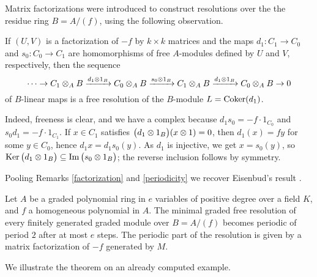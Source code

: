 Matrix factorizations were introduced to construct resolutions over the
the residue ring $B=A/(f)$, using the following observation.

\begin{Remark}
\label{periodicity}
If $(U,V)$ is a factorization of $-f$ by $k\times k$ matrices and the
maps $d_1\colon C_1\to C_0$ and $s_0\colon C_0\to C_1$ are
homomorphisms of free $A$-modules defined by $U$ and $V$, respectively,
then the sequence
\[
\cdots \to
C_1\otimes_AB \xrightarrow{d_1\otimes 1_B}
C_0\otimes_AB \xrightarrow{s_0\otimes 1_B}
C_1\otimes_AB \xrightarrow{d_1\otimes 1_B}
C_0\otimes_AB\to0
\]
of $B$-linear maps is a free resolution of the $B$-module
$L=\operatorname{Coker}(d_1)$.

Indeed, freeness is clear, and we have a complex because $d_1s_0=
-f\cdot 1_{C_0}$ and $s_0d_1=-f\cdot 1_{C_1}$.  If $x\in C_1$ satisfies
$\big(d_1\otimes1_B\big)(x\otimes 1)=0$, then $d_1(x)=fy$ for some $y\in C_0$,
hence $d_1x=d_1s_0(y)$.  As $d_1$ is injective, we get $x=s_0(y)$, so
$\operatorname{Ker}\big(d_1\otimes1_B\big)\subseteq \operatorname{Im}\big(s_0\otimes1_B\big)$; the reverse
inclusion follows by symmetry.
 \end{Remark}

Pooling Remarks \ref{factorization} and \ref{periodicity} we recover
Eisenbud's result \cite[Sect.\ 6]{CI:Ei}.

\begin{theorem}
Let $A$ be a graded polynomial ring in $e$ variables of positive degree
over a field $K$, and $f$ a homogeneous polynomial in $A$.  The minimal
graded free resolution of every finitely generated graded module over
$B=A/(f)$ becomes periodic of period $2$ after at most $e$ steps.  The
periodic part of the resolution is given by a matrix factorization of
$-f$ generated by $M$.
 \end{theorem}

We illustrate the theorem on an already computed example.

